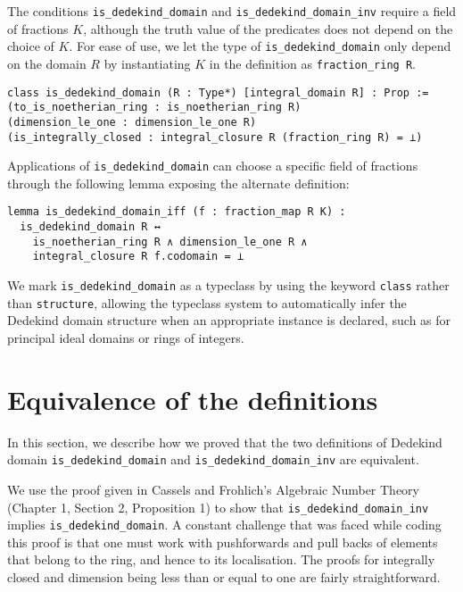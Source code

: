 \documentclass[a4paper,USenglish,cleveref, autoref, thm-restate]{lipics-v2021}
\newcommand{\lean}[1]{\texttt{#1}\xspace} %
\begin{document}
The conditions \lean{is\_dedekind\_domain} and \lean{is\_dedekind\_domain\_inv} require a field of fractions $K$,
although the truth value of the predicates does not depend on the choice of $K$.
For ease of use, we let the type of \lean{is\_dedekind\_domain} only depend on the domain $R$
by instantiating $K$ in the definition as \lean{fraction\_ring R}.
\begin{lstlisting}
class is_dedekind_domain (R : Type*) [integral_domain R] : Prop :=
(to_is_noetherian_ring : is_noetherian_ring R)
(dimension_le_one : dimension_le_one R)
(is_integrally_closed : integral_closure R (fraction_ring R) = ⊥)
\end{lstlisting}
Applications of \lean{is\_dedekind\_domain} can choose a specific field of fractions through the following lemma exposing the alternate definition:
\begin{lstlisting}
lemma is_dedekind_domain_iff (f : fraction_map R K) :
  is_dedekind_domain R ↔
    is_noetherian_ring R ∧ dimension_le_one R ∧
    integral_closure R f.codomain = ⊥
\end{lstlisting}

We mark \lean{is\_dedekind\_domain} as a typeclass by using the keyword \lean{class} rather than \lean{structure},
allowing the typeclass system to automatically infer the Dedekind domain structure when an appropriate instance is declared,
such as for principal ideal domains or rings of integers.

\section{Equivalence of the definitions}

In this section, we describe how we proved that the two definitions of Dedekind domain \lean{is\_dedekind\_domain} and \lean{is\_dedekind\_domain\_inv} are equivalent.

We use the proof given in Cassels and Frohlich's Algebraic Number Theory (Chapter 1, Section 2, Proposition 1) to show that \lean{is\_dedekind\_domain\_inv} implies \lean{is\_dedekind\_domain}. A constant challenge that was faced while coding this proof is that one must work with pushforwards and pull backs of elements that belong to the ring, and hence to its localisation. The proofs for integrally closed and dimension being less than or equal to one are fairly straightforward.
\end{document}
